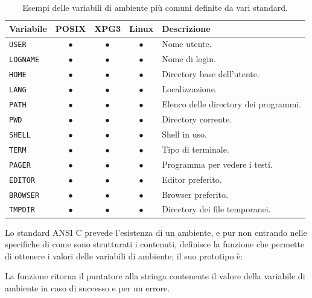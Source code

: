 \begin{table}[htb]
  \centering
  \footnotesize
  \begin{tabular}[c]{|l|c|c|c|l|}
    \hline
    \textbf{Variabile} & \textbf{POSIX} & \textbf{XPG3} 
    & \textbf{Linux} & \textbf{Descrizione} \\
    \hline
    \hline
    \texttt{USER}   &$\bullet$&$\bullet$&$\bullet$& Nome utente.\\
    \texttt{LOGNAME}&$\bullet$&$\bullet$&$\bullet$& Nome di login.\\
    \texttt{HOME}   &$\bullet$&$\bullet$&$\bullet$& Directory base
                                                    dell'utente.\\
    \texttt{LANG}   &$\bullet$&$\bullet$&$\bullet$& Localizzazione.\\
    \texttt{PATH}   &$\bullet$&$\bullet$&$\bullet$& Elenco delle directory
                                                    dei programmi.\\
    \texttt{PWD}    &$\bullet$&$\bullet$&$\bullet$& Directory corrente.\\
    \texttt{SHELL}  &$\bullet$&$\bullet$&$\bullet$& Shell in uso.\\
    \texttt{TERM}   &$\bullet$&$\bullet$&$\bullet$& Tipo di terminale.\\
    \texttt{PAGER}  &$\bullet$&$\bullet$&$\bullet$& Programma per vedere i
                                                    testi.\\
    \texttt{EDITOR} &$\bullet$&$\bullet$&$\bullet$& Editor preferito.\\
    \texttt{BROWSER}&$\bullet$&$\bullet$&$\bullet$& Browser preferito.\\
    \texttt{TMPDIR} &$\bullet$&$\bullet$&$\bullet$& Directory dei file
                                                    temporanei.\\
    \hline
  \end{tabular}
  \caption{Esempi delle variabili di ambiente più comuni definite da vari
    standard.} 
  \label{tab:proc_env_var}
\end{table}

Lo standard ANSI C prevede l'esistenza di un ambiente, e pur non entrando
nelle specifiche di come sono strutturati i contenuti, definisce la funzione
 che permette di ottenere i valori delle variabili di ambiente;
il suo prototipo è:

\begin{funcproto}{ 
}
{La funzione ritorna il puntatore alla stringa contenente il valore della
  variabile di ambiente in caso di successo e  per un errore.} 
\end{funcproto}

